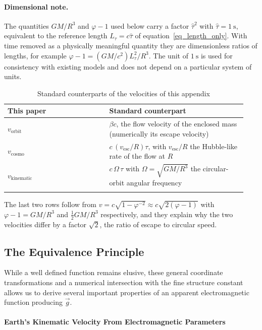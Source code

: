 \documentclass[pdflatex,sn-mathphys-num]{sn-jnl}%
\theoremstyle{thmstyleone}%
\theoremstyle{thmstyletwo}%
\theoremstyle{thmstylethree}%
\begin{document}
\begin{appendices}
\paragraph{Dimensional note.} The quantities $GM/R^3$ and $\varphi-1$ used below carry a factor $\hat{\tau}^{2}$ with $\hat{\tau}=1~\text{s}$, equivalent to the reference length $L_\tau=c\hat{\tau}$ of equation~\eqref{eq_length_only}. With time removed as a physically meaningful quantity they are dimensionless ratios of lengths, for example $\varphi-1=(GM/c^{2})L_\tau^{2}/R^{3}$. The unit of $1~\text{s}$ is used for consistency with existing models and does not depend on a particular system of units.

\begin{table}[h]
\caption{Standard counterparts of the velocities of this appendix}%
\label{table_dictionary_numerics}
\begin{tabular}{@{}p{0.40\linewidth}p{0.54\linewidth}@{}}
\toprule
This paper & Standard counterpart\\
\midrule
$v_{\text{orbit}}$ & $\beta c$, the flow velocity of the enclosed mass (numerically its escape velocity)\\
$v_{\text{cosmo}}$ & $c\,\left(v_{\mathrm{esc}}/R\right)\tau$, with $v_{\mathrm{esc}}/R$ the Hubble-like rate of the flow at $R$\\
$v_{\text{kinematic}}$ & $c\,\Omega\,\tau$ with $\Omega=\sqrt{GM/R^3}$ the circular-orbit angular frequency\\
\botrule
\end{tabular}
\end{table}

The last two rows follow from $v=c\sqrt{1-\varphi^{-2}}\approx c\sqrt{2(\varphi-1)}$ with $\varphi-1=GM/R^3$ and $\tfrac12GM/R^3$ respectively, and they explain why the two velocities differ by a factor $\sqrt{2}$, the ratio of escape to circular speed.


\subsection{The Equivalence Principle}\label{sec_equivalence_principle}
 
While a well defined function remains elusive, these general coordinate transformations and a numerical intersection with the fine structure constant allows us to derive several important properties of an apparent electromagnetic function producing $\vec{g}$.

\paragraph{Earth's Kinematic Velocity From Electromagnetic Parameters}


\end{appendices}
\end{document}
